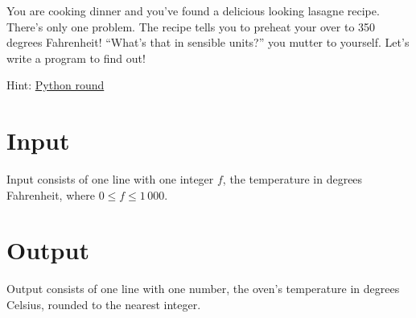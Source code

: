 
You are cooking dinner and you've found a delicious looking lasagne recipe.
There's only one problem.
The recipe tells you to preheat your over to 350 degrees Fahrenheit!
``What's that in sensible units?'' you mutter to yourself.
Let's write a program to find out!

Hint: \href{https://docs.python.org/3/library/functions.html?highlight=round#round}{Python round}

\section*{Input}
Input consists of one line with one integer $f$, the temperature in degrees Fahrenheit, where $0 \leq f \leq 1\,000$.

\section*{Output}
Output consists of one line with one number, 
the oven's temperature in degrees Celsius, rounded to the nearest integer.
    
